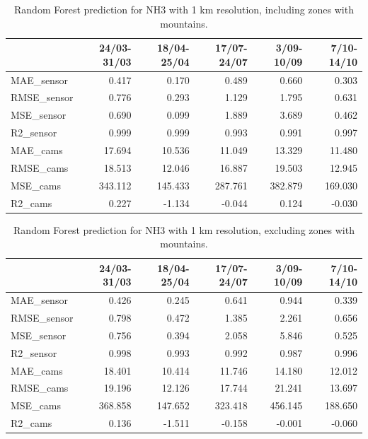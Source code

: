 \begin{table}[H]
\begin{tabular}{lrrrrr}
\toprule
 &  24/03-31/03 &  18/04-25/04 &  17/07-24/07 &  3/09-10/09 &  7/10-14/10 \\
\midrule
 MAE\_sensor &        0.417 &        0.170 &        0.489 &       0.660 &       0.303 \\
RMSE\_sensor &        0.776 &        0.293 &        1.129 &       1.795 &       0.631 \\
 MSE\_sensor &        0.690 &        0.099 &        1.889 &       3.689 &       0.462 \\
  R2\_sensor &        0.999 &        0.999 &        0.993 &       0.991 &       0.997 \\
   MAE\_cams &       17.694 &       10.536 &       11.049 &      13.329 &      11.480 \\
  RMSE\_cams &       18.513 &       12.046 &       16.887 &      19.503 &      12.945 \\
   MSE\_cams &      343.112 &      145.433 &      287.761 &     382.879 &     169.030 \\
    R2\_cams &        0.227 &       -1.134 &       -0.044 &       0.124 &      -0.030 \\
\bottomrule
\end{tabular}
\caption{Random Forest prediction for NH3 with 1 km resolution, including zones with mountains.}
\end{table}
\begin{table}[H]
\begin{tabular}{lrrrrr}
\toprule
 &  24/03-31/03 &  18/04-25/04 &  17/07-24/07 &  3/09-10/09 &  7/10-14/10 \\
\midrule
 MAE\_sensor &        0.426 &        0.245 &        0.641 &       0.944 &       0.339 \\
RMSE\_sensor &        0.798 &        0.472 &        1.385 &       2.261 &       0.656 \\
 MSE\_sensor &        0.756 &        0.394 &        2.058 &       5.846 &       0.525 \\
  R2\_sensor &        0.998 &        0.993 &        0.992 &       0.987 &       0.996 \\
   MAE\_cams &       18.401 &       10.414 &       11.746 &      14.180 &      12.012 \\
  RMSE\_cams &       19.196 &       12.126 &       17.744 &      21.241 &      13.697 \\
   MSE\_cams &      368.858 &      147.652 &      323.418 &     456.145 &     188.650 \\
    R2\_cams &        0.136 &       -1.511 &       -0.158 &      -0.001 &      -0.060 \\
\bottomrule
\end{tabular}
\caption{Random Forest prediction for NH3 with 1 km resolution, excluding zones with mountains.}
\end{table}

